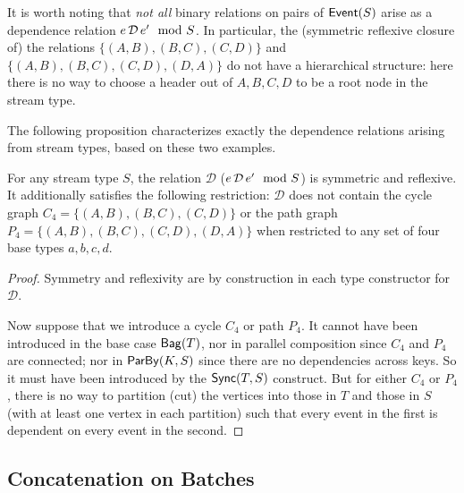 It is worth noting that \emph{not all} binary relations on pairs of $\mathsf{Event}(S)$ arise as a dependence relation $e \,\mathcal{D}\, e' \mod {S}$.
In particular, the (symmetric reflexive closure of)
the relations $\{(A, B), (B, C), (C, D)\}$
and $\{(A, B), (B, C), (C, D), (D, A)\}$
do not have a hierarchical structure:
here there is no way to choose a header out of $A, B, C, D$
to be a root node in the stream type.

The following proposition
characterizes exactly the dependence relations arising from stream types, based on these two examples.
\begin{proposition}
\label{prop:stream-types-less-general}
For any stream type $S$, the relation $\mathcal{D}$ ($e \,\mathcal{D}\, e' \mod {S}$) is symmetric and reflexive.
It additionally satisfies the following restriction:
$\mathcal{D}$ does not contain the cycle graph $C_4 = \{(A, B), (B, C), (C, D)\}$
or the path graph $P_4 = \{(A, B), (B, C), (C, D), (D, A)\}$ when restricted
to any set of four base types $a, b, c, d$.
\end{proposition}
\begin{proof}
Symmetry and reflexivity are by construction in each type constructor for
$\mathcal{D}$.

Now suppose that we introduce a cycle $C_4$ or path $P_4$.
It cannot have been introduced in the base case $\mathsf{Bag}({T})$,
nor in parallel composition since $C_4$ and $P_4$ are connected;
nor in $\mathsf{ParBy}({K}, S)$ since there are no dependencies across keys.
So it must have been introduced by the $\mathsf{Sync}({T}, S)$ construct.
But for either $C_4$ or $P_4$, there is no way to partition (cut) the vertices into those in
$T$ and those in $S$ (with at least one vertex in each partition) such that every event in the first is
dependent on every event in the second.
\end{proof}

\subsection{Concatenation on Batches}

